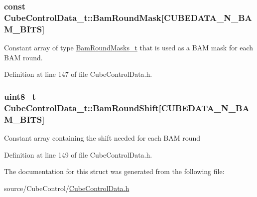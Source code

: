 \hypertarget{struct_cube_control_data__t_a27e68e649dcb5beced5b6b7c92419ec5}{}
\subsubsection[{Bam\+Round\+Mask}]{ const Cube\+Control\+Data\+\_\+t\+::\+Bam\+Round\+Mask\mbox{[}{\bf C\+U\+B\+E\+D\+A\+T\+A\+\_\+\+N\+\_\+\+B\+A\+M\+\_\+\+B\+I\+T\+S}\mbox{]}}\label{struct_cube_control_data__t_a27e68e649dcb5beced5b6b7c92419ec5}
Constant array of type \hyperlink{_cube_control_data_8h_a2b6850a8815b785ea51f17c4d979706e}{Bam\+Round\+Masks\+\_\+t} that is used as a B\+A\+M mask for each B\+A\+M round. 

Definition at line 147 of file Cube\+Control\+Data.\+h.

\hypertarget{struct_cube_control_data__t_a945206c33a16ec4249c30e2b698dccff}{}
\subsubsection[{Bam\+Round\+Shift}]{\setlength{\rightskip}{0pt plus 5cm}uint8\+\_\+t Cube\+Control\+Data\+\_\+t\+::\+Bam\+Round\+Shift\mbox{[}{\bf C\+U\+B\+E\+D\+A\+T\+A\+\_\+\+N\+\_\+\+B\+A\+M\+\_\+\+B\+I\+T\+S}\mbox{]}}\label{struct_cube_control_data__t_a945206c33a16ec4249c30e2b698dccff}
Constant array containing the shift needed for each B\+A\+M round 

Definition at line 149 of file Cube\+Control\+Data.\+h.



The documentation for this struct was generated from the following file\+:\begin{DoxyCompactItemize}
\item 
source/\+Cube\+Control/\hyperlink{_cube_control_data_8h}{Cube\+Control\+Data.\+h}\end{DoxyCompactItemize}
